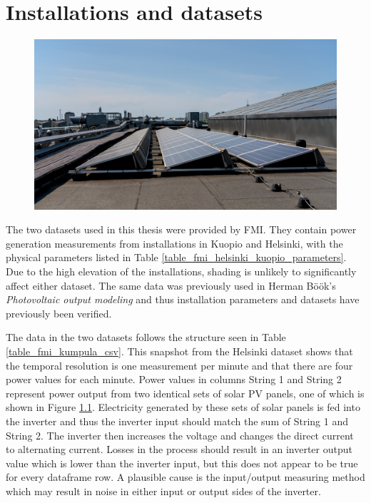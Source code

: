 \chapter{Installations and datasets}

\begin{figure}[h]
\centering
\includegraphics[width=0.8\linewidth]{pics/fmikumpula}
\label{fig_fmikumpula_panels}
\end{figure}


\noindent The two datasets used in this thesis were provided by FMI. They contain power generation measurements from installations in Kuopio and Helsinki, with the physical parameters listed in Table \ref{table_fmi_helsinki_kuopio_parameters}. Due to the high elevation of the installations, shading is unlikely to significantly affect either dataset. The same data was previously used in Herman Böök's \textit{Photovoltaic output modeling}\cite{hbook1} and thus installation parameters and datasets have previously been verified.

The data in the two datasets follows the structure seen in Table \ref{table_fmi_kumpula_csv}. This snapshot from the Helsinki dataset shows that the temporal resolution is one measurement per minute and that there are four power values for each minute. Power values in columns String 1 and String 2 represent power output from two identical sets of solar PV panels, one of which is shown in Figure \ref{fig_fmikumpula_panels}. Electricity generated by these sets of solar panels is fed into the inverter and thus the inverter input should match the sum of String 1 and String 2. The inverter then increases the voltage and changes the direct current to alternating current. Losses in the process should result in an inverter output value which is lower than the inverter input, but this does not appear to be true for every dataframe row. A plausible cause is the input/output measuring method which may result in noise in either input or output sides of the inverter.


